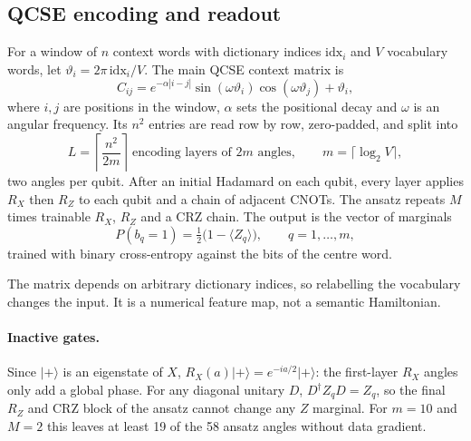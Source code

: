 \documentclass[11pt,a4paper]{article}
\providecommand{\ket}[1]{\lvert #1\rangle}
\begin{document}
  \subsection{QCSE encoding and readout}
  \label{app:qcse}
  For a window of $n$ context words with dictionary indices $\mathrm{idx}_i$ and $V$ vocabulary words, let $\vartheta_i=2\pi\,\mathrm{idx}_i/V$. The main QCSE context matrix is
  \begin{equation}
    C_{ij}=e^{-\alpha|i-j|}\sin(\omega\vartheta_i)\cos(\omega\vartheta_j)+\vartheta_i ,
  \end{equation}
  where $i,j$ are positions in the window, $\alpha$ sets the positional decay and $\omega$ is an angular frequency. Its $n^2$ entries are read row by row, zero-padded, and split into
  \begin{equation}
    L=\left\lceil \frac{n^2}{2m}\right\rceil \ \text{encoding layers of $2m$ angles},\qquad m=\lceil\log_2 V\rceil ,
  \end{equation}
  two angles per qubit. After an initial Hadamard on each qubit, every layer applies $R_X$ then $R_Z$ to each qubit and a chain of adjacent CNOTs. The ansatz repeats $M$ times trainable $R_X$, $R_Z$ and a CRZ chain. The output is the vector of marginals
  \begin{equation}
    P(b_q=1)=\tfrac12\bigl(1-\langle Z_q\rangle\bigr),\qquad q=1,\dots,m,
  \end{equation}
  trained with binary cross-entropy against the bits of the centre word.

  The matrix depends on arbitrary dictionary indices, so relabelling the vocabulary changes the input. It is a numerical feature map, not a semantic Hamiltonian.

  \paragraph{Inactive gates.}
  Since $\ket{+}$ is an eigenstate of $X$, $R_X(a)\ket{+}=e^{-ia/2}\ket{+}$: the first-layer $R_X$ angles only add a global phase. For any diagonal unitary $D$, $D^\dagger Z_q D=Z_q$, so the final $R_Z$ and CRZ block of the ansatz cannot change any $Z$ marginal. For $m=10$ and $M=2$ this leaves at least 19 of the 58 ansatz angles without data gradient.
\end{document}
